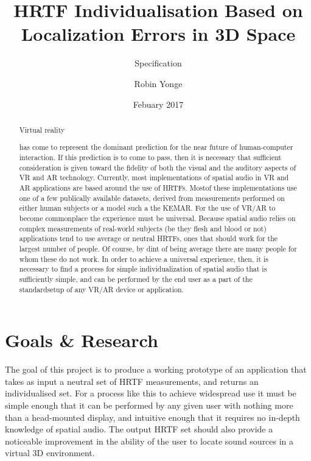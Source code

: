 \documentclass[10pt, oneside, a4paper, draft]{scrartcl}
\begin{document}

\title{HRTF Individualisation Based on Localization Errors in 3D Space}
\subtitle{Specification}
\author{Robin Yonge}
\date{Febuary 2017}
\maketitle

\renewcommand{\abtractname}{Introduction} %
\begin {abstract}
Virtual reality has come to represent the dominant prediction for the near future of human-computer interaction. If this prediction is to come to pass, then it is necessary that sufficient consideration is given toward the fidelity of both the visual and the auditory aspects of VR and AR technology. Currently, most implementations of spatial audio in VR and AR applications are based around the use of HRTFs. Mostof these implementations use one of a few publically available datasets, derived from measurements performed on either human subjects or a model such a the KEMAR\cite{Algazi2001}\cite{Gardner1994}. For the use of VR/AR to become commonplace the experience must be universal. Because spatial audio relies on complex measurements of real-world subjects (be they flesh and blood or not) applications tend to use average or neutral HRTFs, ones that should work for the largest number of people. Of course, by dint of being average there are many people for whom these do not work. In order to achieve a universal experience, then, it is necessary to find a process for  simple individualization of spatial audio that is sufficiently simple, and can be performed by the end user as a part of the standardsetup of any VR/AR device or application.
\end {abstract}

\section*{Goals & Research}
The goal of this project is to produce a working prototype of an application that takes as input a neutral set of HRTF measurements, and returns an individualised set. For a process like this to achieve widespread use it must be simple enough that it can be performed by any given user with nothing more than a head-mounted display, and intuitive enough that it requires no in-depth knowledge of spatial audio. The output HRTF set should also provide a noticeable improvement in the ability of the user to locate sound sources in a virtual 3D environment.
\end{document}
